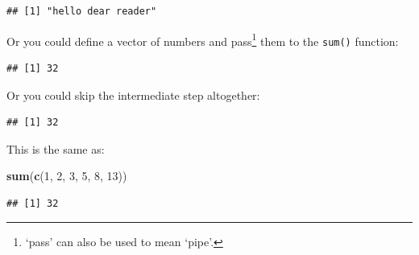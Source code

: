 \documentclass[]{book}
\newenvironment{Shaded}{\begin{snugshade}}{\end{snugshade}}
\newcommand{\DecValTok}[1]{\textcolor[rgb]{0.00,0.00,0.81}{#1}}
\newcommand{\KeywordTok}[1]{\textcolor[rgb]{0.13,0.29,0.53}{\textbf{#1}}}
\newcommand{\NormalTok}[1]{#1}
\newcommand{\OperatorTok}[1]{\textcolor[rgb]{0.81,0.36,0.00}{\textbf{#1}}}
\newcommand{\StringTok}[1]{\textcolor[rgb]{0.31,0.60,0.02}{#1}}
\begin{document}
\begin{verbatim}
## [1] "hello dear reader"
\end{verbatim}

Or you could define a vector of numbers and pass\footnote{`pass' can also be used to mean `pipe'.} them to the \texttt{sum()} function:

\begin{Shaded}
\end{Shaded}

\begin{verbatim}
## [1] 32
\end{verbatim}

Or you could skip the intermediate step altogether:

\begin{Shaded}
\end{Shaded}

\begin{verbatim}
## [1] 32
\end{verbatim}

This is the same as:

\begin{Shaded}
\begin{Highlighting}[]
\KeywordTok{sum}\NormalTok{(}\KeywordTok{c}\NormalTok{(}\DecValTok{1}\NormalTok{, }\DecValTok{2}\NormalTok{, }\DecValTok{3}\NormalTok{, }\DecValTok{5}\NormalTok{, }\DecValTok{8}\NormalTok{, }\DecValTok{13}\NormalTok{))}
\end{Highlighting}
\end{Shaded}

\begin{verbatim}
## [1] 32
\end{verbatim}
\end{document}
